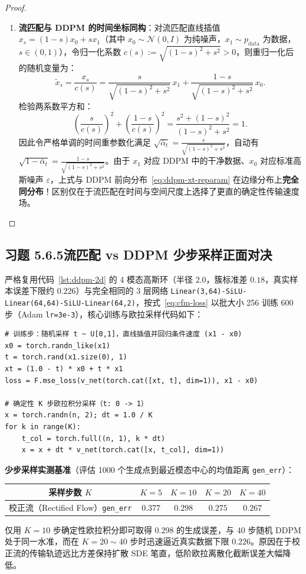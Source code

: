\begin{proof}
\begin{enumerate}[label=(\alph*), leftmargin=1.8em]
  \item \textbf{流匹配与 DDPM 的时间坐标同构}：对流匹配直线插值 $x_s = (1-s)x_0 + s x_1$（其中 $x_0 \sim \mathcal{N}(0, I)$ 为纯噪声，$x_1 \sim p_{\text{data}}$ 为数据，$s \in (0, 1)$），令归一化系数 $c(s) := \sqrt{(1-s)^2 + s^2} > 0$，则重归一化后的随机变量为：
  \[
    \tilde{x}_s = \frac{x_s}{c(s)}
    = \frac{s}{\sqrt{(1-s)^2 + s^2}}\, x_1 + \frac{1-s}{\sqrt{(1-s)^2 + s^2}}\, x_0.
  \]
  检验两系数平方和：
  \[
    \left(\frac{s}{c(s)}\right)^2 + \left(\frac{1-s}{c(s)}\right)^2 = \frac{s^2 + (1-s)^2}{(1-s)^2 + s^2} = 1.
  \]
  因此令严格单调的时间重参数化满足 $\sqrt{\bar{\alpha}_t} = \frac{s}{\sqrt{(1-s)^2 + s^2}}$，自动有 $\sqrt{1-\bar{\alpha}_t} = \frac{1-s}{\sqrt{(1-s)^2 + s^2}}$。由于 $x_1$ 对应 DDPM 中的干净数据、$x_0$ 对应标准高斯噪声 $\varepsilon$，上式与 DDPM 前向分布~\eqref{eq:ddpm-xt-reparam} 在边缘分布上\textbf{完全同分布}！区别仅在于流匹配在时间与空间尺度上选择了更直的确定性传输速度场。
\end{enumerate}
\end{proof}

\subsection*{习题 5.6.5\quad 流匹配 vs DDPM 少步采样正面对决}
严格复用代码~\ref{lst:ddpm-2d} 的 4 模态高斯环（半径 $2.0$，簇标准差 $0.18$，真实样本误差下限约 $0.226$）与完全相同的 3 层网络 \texttt{Linear(3,64)-SiLU-Linear(64,64)-SiLU-Linear(64,2)}，按式~\eqref{eq:cfm-loss} 以批大小 256 训练 600 步（Adam \texttt{lr=3e-3}），核心训练与欧拉采样代码如下：
\begin{lstlisting}
# 训练步：随机采样 t ~ U[0,1]，直线插值并回归条件速度 (x1 - x0)
x0 = torch.randn_like(x1)
t = torch.rand(x1.size(0), 1)
xt = (1.0 - t) * x0 + t * x1
loss = F.mse_loss(v_net(torch.cat([xt, t], dim=1)), x1 - x0)

# 确定性 K 步欧拉积分采样（t: 0 -> 1）
x = torch.randn(n, 2); dt = 1.0 / K
for k in range(K):
    t_col = torch.full((n, 1), k * dt)
    x = x + dt * v_net(torch.cat([x, t_col], dim=1))
\end{lstlisting}
\textbf{少步采样实测基准}（评估 1000 个生成点到最近模态中心的均值距离 \texttt{gen\_err}）：
\begin{center}
\small
\begin{tabular}{@{}ccccc@{}}
\toprule
采样步数 $K$ & $K = 5$ & $K = 10$ & $K = 20$ & $K = 40$ \\
\midrule
校正流（Rectified Flow）\texttt{gen\_err} & $0.377$ & $0.298$ & $0.275$ & $0.267$ \\
\bottomrule
\end{tabular}
\end{center}
仅用 $K = 10$ 步确定性欧拉积分即可取得 $0.298$ 的生成误差，与 40 步随机 DDPM 处于同一水准，而在 $K = 20 \sim 40$ 步时迅速逼近真实数据下限 $0.226$。原因在于校正流的传输轨迹远比方差保持扩散 SDE 笔直，低阶欧拉离散化截断误差大幅降低。

